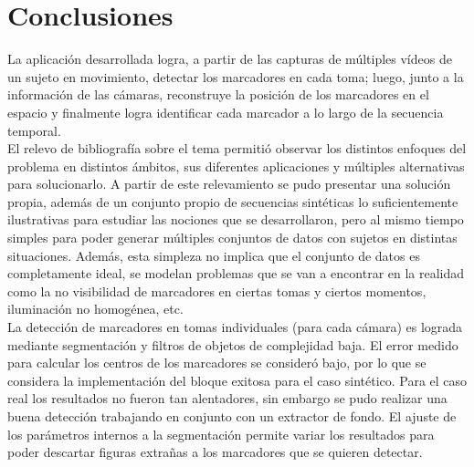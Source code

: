 \chapter{Conclusiones}
\label{conclusiones}



La aplicación desarrollada logra, a partir de las capturas de múltiples vídeos de un sujeto en movimiento, detectar los marcadores en cada toma; luego, junto a la información de las cámaras, reconstruye la posición de los marcadores en el espacio y finalmente logra identificar cada marcador a lo largo de la secuencia temporal.
\\ 

El relevo de bibliografía sobre el tema permitió observar los distintos enfoques del problema en distintos ámbitos, sus diferentes aplicaciones y múltiples alternativas para solucionarlo. A partir de este relevamiento se pudo presentar una solución propia, además de un conjunto propio de secuencias sintéticas lo suficientemente ilustrativas para estudiar las nociones que se desarrollaron, pero al mismo tiempo simples para poder generar múltiples conjuntos de datos con sujetos en distintas situaciones. Además, esta simpleza no implica que el conjunto de datos es completamente ideal, se modelan problemas que se van a encontrar en la realidad como la no visibilidad de marcadores en ciertas tomas y ciertos momentos, iluminación no homogénea, etc.
\\ 

La detección de marcadores en tomas individuales (para cada cámara) es lograda mediante segmentación y filtros de objetos de complejidad baja. El error medido para calcular los centros de los marcadores se consideró bajo, por lo que se considera la implementación del bloque exitosa para el caso sintético. Para el caso real los resultados no fueron tan alentadores, sin embargo se pudo realizar una buena detección trabajando en conjunto con un extractor de fondo. El ajuste de los parámetros internos a la segmentación permite variar los resultados para poder descartar figuras extrañas a los marcadores que se quieren detectar.
\\ 


